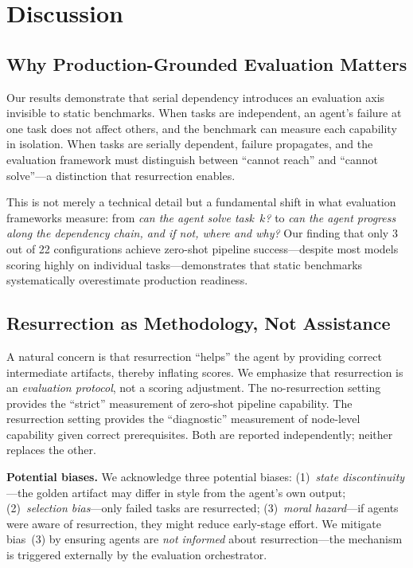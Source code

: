 \section{Discussion}

\subsection{Why Production-Grounded Evaluation Matters}

Our results demonstrate that serial dependency introduces an evaluation axis invisible to static benchmarks.
When tasks are independent, an agent's failure at one task does not affect others, and the benchmark can measure each capability in isolation.
When tasks are serially dependent, failure propagates, and the evaluation framework must distinguish between ``cannot reach'' and ``cannot solve''---a distinction that resurrection enables.

This is not merely a technical detail but a fundamental shift in what evaluation frameworks measure: from \emph{can the agent solve task~$k$?} to \emph{can the agent progress along the dependency chain, and if not, where and why?}
Our finding that only 3 out of 22 configurations achieve zero-shot pipeline success---despite most models scoring highly on individual tasks---demonstrates that static benchmarks systematically overestimate production readiness.

\subsection{Resurrection as Methodology, Not Assistance}

A natural concern is that resurrection ``helps'' the agent by providing correct intermediate artifacts, thereby inflating scores.
We emphasize that resurrection is an \emph{evaluation protocol}, not a scoring adjustment.
The no-resurrection setting provides the ``strict'' measurement of zero-shot pipeline capability.
The resurrection setting provides the ``diagnostic'' measurement of node-level capability given correct prerequisites.
Both are reported independently; neither replaces the other.

\textbf{Potential biases.}
We acknowledge three potential biases: (1)~\emph{state discontinuity}---the golden artifact may differ in style from the agent's own output; (2)~\emph{selection bias}---only failed tasks are resurrected; (3)~\emph{moral hazard}---if agents were aware of resurrection, they might reduce early-stage effort.
We mitigate bias~(3) by ensuring agents are \emph{not informed} about resurrection---the mechanism is triggered externally by the evaluation orchestrator.

